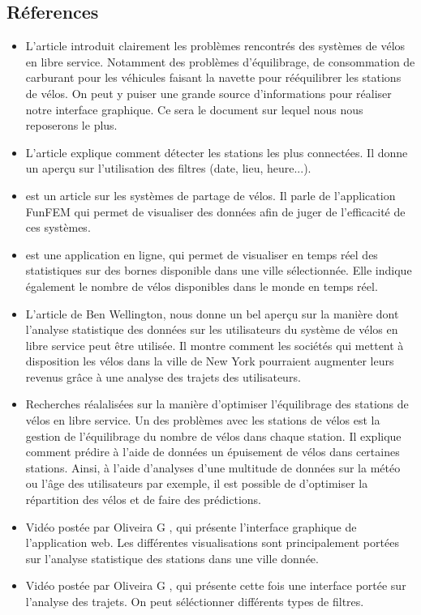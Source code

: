 \documentclass[12pt]{article}
\begin{document}
		\subsection{Réferences}
			\begin{itemize}
				\item L'article \cite{Oli16} introduit clairement les problèmes rencontrés des systèmes de vélos en libre service. Notamment des problèmes d'équilibrage, de consommation de carburant pour les véhicules faisant la navette pour rééquilibrer les stations de vélos. On peut y puiser une grande source d'informations pour réaliser notre interface graphique. Ce sera le document sur lequel nous nous reposerons le plus.

				\item L'article \cite{Ali14} explique comment détecter les stations les plus connectées. Il donne un aperçu sur  l'utilisation des filtres (date, lieu, heure...).

				\item \cite{BC16} est un article sur les systèmes de partage de vélos. Il parle de l'application FunFEM qui permet de visualiser des données afin de juger de l'efficacité de ces systèmes.

				\item \cite{BSM17} est une application en ligne, qui permet de visualiser en temps réel des statistiques sur des bornes disponible dans une ville sélectionnée.  Elle indique également le nombre de vélos disponibles dans le monde en temps réel.

				\item L'article \cite{BW} de Ben Wellington, nous donne un bel aperçu sur la manière dont l'analyse statistique des données sur les utilisateurs du système de vélos en libre service peut être utilisée. Il montre comment les sociétés qui mettent à disposition les vélos dans la ville de New York pourraient augmenter leurs revenus grâce à une analyse des trajets des utilisateurs.

				\item \cite{JL} Recherches réalalisées sur la manière d'optimiser l'équilibrage des stations de vélos en libre service. Un des problèmes avec les stations de vélos est la gestion de l'équilibrage du nombre de  vélos dans chaque station. Il explique comment prédire à l'aide de données un épuisement de vélos dans certaines stations. Ainsi, à l'aide d'analyses d'une multitude de données sur la météo ou l'âge des utilisateurs par exemple, il est possible de d'optimiser la répartition des vélos et de faire des prédictions.

				\item Vidéo postée par Oliveira G \cite{state_station}, qui présente l'interface graphique de l'application web. Les différentes visualisations sont principalement portées sur l'analyse statistique des stations dans une ville donnée.

				\item Vidéo postée par Oliveira G \cite{trips}, qui présente cette fois une interface portée sur l'analyse des trajets. On peut séléctionner différents types de filtres.

			\end{itemize}
	\newpage
			
\end{document}
